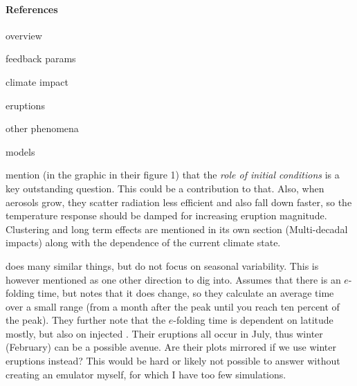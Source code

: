 \documentclass{ametsocV5}
\begin{document}
\paragraph*{References}

\begin{description}
  \item[overview] \citet{marshall2022}
  \item[feedback params] \citet{boer2007, gunther2022, gregory2020, hansen2005, knutti2017,
      marvel2016, merlis2014, ollila2016, pauling2021, richardson2019, salvi2022, wigley2005}
  \item[climate impact] \citet{gregory2016, jones2005, ottobliesner2016, santer2016,
      timmreck2009, timmreck2010, toohey2016b, yang2019, yokohata2005, zanchettin2019}
  \item[eruptions] \citet{arfeuille2014, douglass2006, lin2022, marshall2019, marshall2020,
      marshall2021, soden2002, sukhodolov2018}
  \item[other phenomena] \citet{chen2022, lehner2016, marshall2018}
  \item[models] \citet{rypdal2012}
\end{description}

\citet{marshall2022} mention (in the graphic in their figure 1) that the \emph{role of
  initial conditions} is a key outstanding question. This could be a contribution to
that. Also, when aerosols grow, they scatter radiation less efficient and also fall
down faster, so the temperature response should be damped for increasing eruption
magnitude. Clustering and long term effects are mentioned in its own section
(Multi-decadal impacts) along with the dependence of the current climate state.

\citet{marshall2019} does many similar things, but do not focus on seasonal variability.
This is however mentioned as one other direction to dig into. Assumes that there is an
$e$-folding time, but notes that it does change, so they calculate an average time over
a small range (from a month after the peak until you reach ten percent of the peak).
They further note that the $e$-folding time is dependent on latitude mostly, but also on
injected . Their eruptions all occur in July, thus winter (February) can be a
possible avenue. Are their plots mirrored if we use winter eruptions instead? This would
be hard or likely not possible to answer without creating an emulator myself, for which
I have too few simulations.

\end{document}
